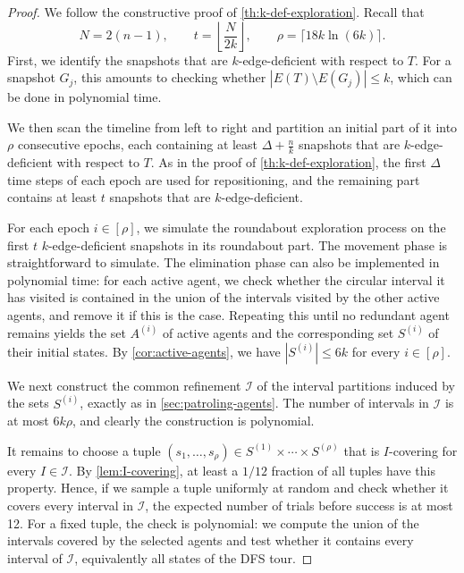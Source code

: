 \documentclass[a4paper,11pt]{article}
\theoremstyle{definition}
\theoremstyle{remark}
\newcommand{\bfI}{\ensuremath{\mathcal{I}}}
\begin{document}
    \begin{proof}
        We follow the constructive proof of \cref{th:k-def-exploration}. Recall that
        \[
            N=2(n-1), \qquad
            t=\left\lfloor \frac{N}{2k}\right\rfloor,
            \qquad
            \rho=\lceil 18k\ln(6k)\rceil .
        \]
        First, we identify the snapshots that are $k$-edge-deficient with respect to $T$. For a snapshot $G_j$, this amounts to checking whether
        $|E(T)\setminus E(G_j)|\leq k$,
        which can be done in polynomial time.

        We then scan the timeline from left to right and partition an initial part of it into $\rho$ consecutive epochs, each containing at least
        $\Delta+\frac{n}{k}$
        snapshots that are $k$-edge-deficient with respect to $T$. As in the proof of \cref{th:k-def-exploration}, the first $\Delta$ time steps of each epoch are used for repositioning, and the remaining part contains at least $t$ snapshots that are $k$-edge-deficient.

        For each epoch $i \in [\rho]$, we simulate the roundabout exploration process on the first $t$ $k$-edge-deficient snapshots in its roundabout part. The movement phase is straightforward to simulate. The elimination phase can also be implemented in polynomial time: for each active agent, we check whether the circular interval it has visited is contained in the union of the intervals visited by the other active agents, and remove it if this is the case. Repeating this until no redundant agent remains yields the set $A^{(i)}$ of active agents and the corresponding set $S^{(i)}$ of their initial states. By \cref{cor:active-agents}, we have
        $|S^{(i)}|\leq 6k$ for every $i \in [\rho]$.

        We next construct the common refinement $\bfI$ of the interval partitions induced by the sets $S^{(i)}$, exactly as in \cref{sec:patroling-agents}. The number of intervals in $\bfI$ is at most $6k\rho$, and clearly the construction is polynomial.

        It remains to choose a tuple
        $(s_1,\ldots,s_\rho) \in
            S^{(1)}\times\cdots\times S^{(\rho)}$
        that is $I$-covering for every $I \in \bfI$. By \cref{lem:I-covering}, at least a $1/12$ fraction of all tuples have this property. Hence, if we sample a tuple uniformly at random and check whether it covers every interval in $\bfI$, the expected number of trials before success is at most 12. For a fixed tuple, the check is polynomial: we compute the union of the intervals covered by the selected agents and test whether it contains every interval of $\bfI$, equivalently all states of the DFS tour.


\end{proof}
\end{document}
